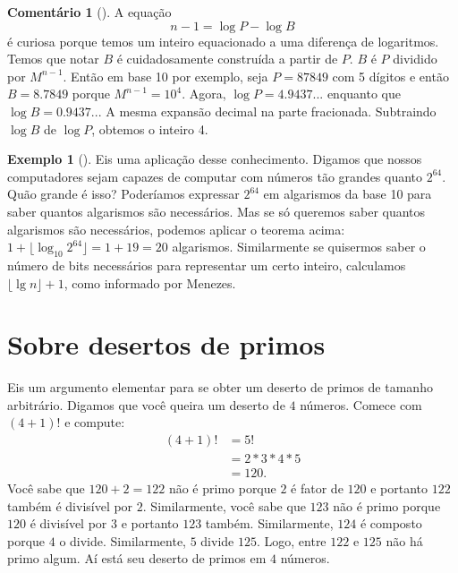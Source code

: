 \documentclass{article}
\theoremstyle{definition}
\newtheorem{example}{Exemplo}[section]
\newtheorem{remark}{Comentário}[section]
\theoremstyle{pf}
\newcommand{\rem}[1]{\jmp\begin{remark}[#1]}
\newcommand{\mer}{\end{remark}}
\newcommand{\ex}[1]{\jmp\begin{example}[#1]}
\newcommand{\xe}{\end{example}}
\newcommand{\jmp}{\vspace{3pt}}
\newcommand{\floor}[1]{\lfloor #1 \rfloor}
\begin{document}
\rem{} A equação 
%
  $$n - 1 = \log P - \log B$$
%
é curiosa porque temos um inteiro equacionado a uma diferença de
logaritmos.  Temos que notar $B$ é cuidadosamente construída a partir
de $P$.  $B$ é $P$ dividido por $M^{n - 1}$.  Então em base 10 por
exemplo, seja $P = 87849$ com 5 dígitos e então $B = 8.7849$ porque
$M^{n - 1} = 10^4$.  Agora, $\log P = 4.9437...$ enquanto que $\log B
= 0.9437...$ A mesma expansão decimal na parte fracionada.  Subtraindo
$\log B$ de $\log P$, obtemos o inteiro 4.\mer

\ex{} Eis uma aplicação desse conhecimento.  Digamos que nossos
computadores sejam capazes de computar com números tão grandes quanto
$2^{64}$.  Quão grande é isso?  Poderíamos expressar $2^{64}$ em
algarismos da base 10 para saber quantos algarismos são necessários.
Mas se só queremos saber quantos algarismos são necessários, podemos
aplicar o teorema acima: $1 + \floor{\log_{10} 2^{64}} = 1 + 19 = 20$
algarismos.  Similarmente se quisermos saber o número de bits
necessários para representar um certo inteiro, calculamos
$\floor{\lg n} + 1$, como informado por Menezes.  \xe




\section{Sobre desertos de primos}

Eis um argumento elementar para se obter um deserto de primos de
tamanho arbitrário. Digamos que você queira um deserto de $4$ números.
Comece com $(4+1)!$ e compute:%
\begin{align*}
        (4+1)! &= 5! \\
        &= 2*3*4*5 \\
        &= 120.
\end{align*}
Você sabe que $120 + 2 = 122$ não é primo porque $2$ é fator de $120$
e portanto $122$ também é divisível por $2.$ Similarmente, você sabe
que $123$ não é primo porque $120$ é divisível por $3$ e portanto
$123$ também.  Similarmente, $124$ é composto porque $4$ o
divide. Similarmente, $5$ divide $125.$ Logo, entre $122$ e $125$ não
há primo algum. Aí está seu deserto de primos em $4$ números.
\end{document}
